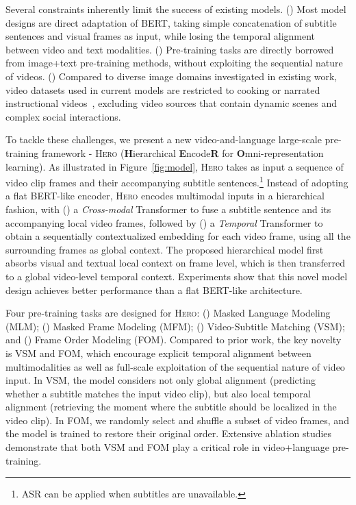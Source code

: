 \documentclass[11pt,a4paper]{article}
\begin{document}
Several constraints inherently limit the success of existing models. () Most model designs are direct adaptation of BERT, taking simple concatenation of subtitle sentences and visual frames as input, while losing the temporal alignment between video and text modalities. 
() Pre-training tasks are directly borrowed from image+text pre-training methods, without exploiting the sequential nature of videos.
() Compared to diverse image domains investigated in existing work, video datasets used in current models are restricted to cooking or narrated instructional videos~\cite{miech2019howto100m}, excluding video sources that contain dynamic scenes and complex social interactions.


To tackle these challenges, we present a new video-and-language large-scale pre-training framework - \textsc{Hero} (\textbf{H}ierarchical \textbf{E}ncode\textbf{R} for \textbf{O}mni-representation learning). As illustrated in Figure~\ref{fig:model}, \textsc{Hero} takes as input a sequence of video clip frames and their accompanying subtitle sentences.\footnote{ASR can be applied when subtitles are unavailable.} Instead of adopting a flat BERT-like encoder, \textsc{Hero} encodes multimodal inputs in a hierarchical fashion, with () a \emph{Cross-modal} Transformer to fuse a subtitle sentence and its accompanying local video frames, followed by () a \emph{Temporal} Transformer to obtain a sequentially contextualized embedding for each video frame, using all the surrounding frames as global context. The proposed hierarchical model first absorbs visual and textual local context on frame level, which is then transferred to a global video-level temporal context. Experiments show that this novel model design achieves better performance than a flat BERT-like architecture. 

Four pre-training tasks are designed for \textsc{Hero}: () Masked Language Modeling (MLM); () Masked Frame Modeling (MFM); () Video-Subtitle Matching (VSM); and () Frame Order Modeling (FOM). Compared to prior work, the key novelty is VSM and FOM, which encourage explicit temporal alignment between multimodalities as well as full-scale exploitation of the sequential nature of video input. 
In VSM, the model considers not only global alignment (predicting whether a subtitle matches the input video clip), but also local temporal alignment (retrieving the moment where the subtitle should be localized in the video clip). In FOM, we randomly select and shuffle a subset of video frames, and the model is trained to restore their original order. Extensive ablation studies demonstrate that both VSM and FOM play a critical role in video+language pre-training. 
\end{document}
